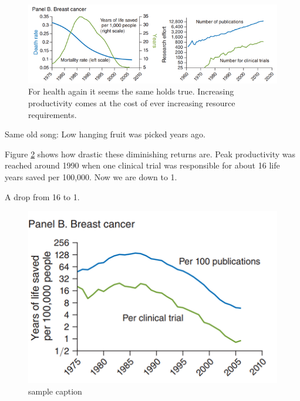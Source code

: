 \documentclass[
]{book}
\begin{document}
\begin{figure}

{\centering \includegraphics[width=1\linewidth]{img/ch1/moore18} 

}

\caption{For health again it seems the same holds true. Increasing productivity comes at the cost of ever increasing resource requirements.}\label{fig:fig118}
\end{figure}

Same old song: Low hanging fruit was picked years ago.

Figure \ref{fig:fig119} shows how drastic these diminishing returns are. Peak productivity was reached around 1990 when one clinical trial was responsible for about 16 life years saved per 100,000. Now we are down to 1.

A drop from 16 to 1.

\begin{figure}

{\centering \includegraphics[width=1\linewidth]{img/ch1/moore19} 

}

\caption{sample caption}\label{fig:fig119}
\end{figure}
\end{document}
